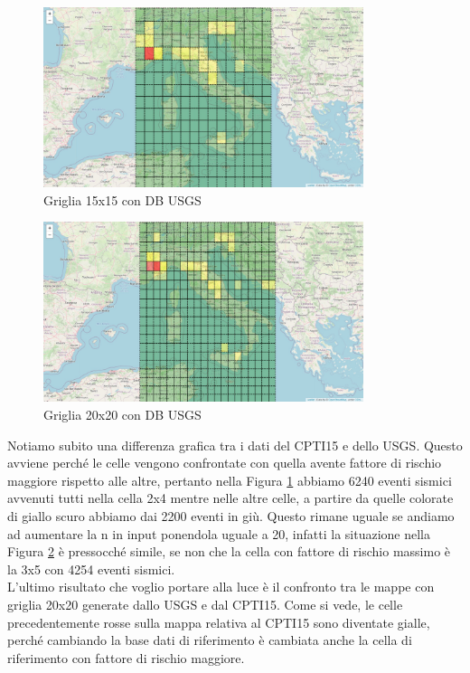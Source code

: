 \begin{figure}[H]
   \centering
   \includegraphics[width=0.835\textwidth]{images/15x15_USGS.jpg}
   \caption{Griglia 15x15 con DB USGS}
   \label{fig:15x15USGS}
\end{figure}

\begin{figure}[H]
   \centering
   \includegraphics[width=0.835\textwidth]{images/20x20_USGS.jpg}
   \caption{Griglia 20x20 con DB USGS}
   \label{fig:20x20USGS}
\end{figure}

Notiamo subito una differenza grafica tra i dati del CPTI15 e dello USGS. Questo avviene perch\'e le celle vengono confrontate con quella avente fattore di rischio maggiore rispetto alle altre, pertanto nella Figura \ref{fig:15x15USGS} abbiamo 6240 eventi sismici avvenuti tutti nella cella 2x4 mentre nelle altre celle, a partire da quelle colorate di giallo scuro abbiamo dai 2200 eventi in gi\`u. Questo rimane uguale se andiamo ad aumentare la n in input ponendola uguale a 20, infatti la situazione nella Figura \ref{fig:20x20USGS} \`e pressocch\'e simile, se non che la cella con fattore di rischio massimo \`e la 3x5 con 4254 eventi sismici.\\
L'ultimo risultato che voglio portare alla luce \`e il confronto tra le mappe con griglia 20x20 generate dallo USGS e dal CPTI15. Come si vede, le celle precedentemente rosse sulla mappa relativa al CPTI15 sono diventate gialle, perch\'e cambiando la base dati di riferimento \`e cambiata anche la cella di riferimento con fattore di rischio maggiore.

